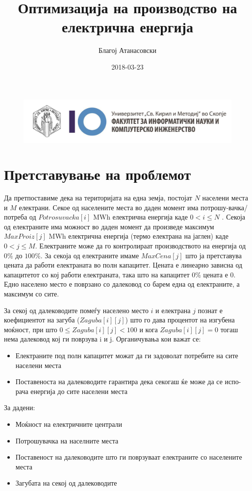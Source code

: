 \documentclass{article}
\title{Оптимизација на производство на електрична енергија}
\date{2018-03-23}
\author{Благој Атанасовски}
\begin{document}
\begin{figure}
\includegraphics[scale=.4]{image}
\end{figure}

\maketitle
\newpage

\section{Претставување на проблемот}
Да претпоставиме дека на територијата на една земја, постојат $N$ населени места и $M$ електрани. Секое од населените места во даден момент има потрошу-вачка/потреба од $ Potrosuvacka[i] $ MWh електрична енергија каде $ 0 < i \leq N $ . Секоја од електраните има можност во даден момент да произведе максимум $MaxProiz[j]$ MWh електрична енергија (термо електрана на јаглен) каде $0 < j \leq M$. Електраните може да го контролираат производството на енергија од $0\%$ до $100\%$. За секоја од електраните имаме $MaxCena[j]$ што ја претставува цената да работи електраната во полн капацитет. Цената е линеарно зависна од капацитетот со кој работи електраната, така што на капацитет 0\% цената е 0. Едно населено место е поврзано со далековод со барем една од електраните, а максимум со сите. 

За секој од далеководите помеѓу населено место $i$ и електрана $j$ познат е коефициентот на загуба ($Zaguba[i][j]$) што го дава процентот на изгубена моќност, при што $0 \leq Zaguba[i][j] < 100 $ и кога $Zaguba[i][j] = 0$ тогаш нема далековод кој ги поврзува i и j. Органичувања кои важат се:
\begin{itemize}
\item Електраните под полн капацитет можат да ги задоволат потребите на сите населени места
\item Поставеноста на далеководите гарантира дека секогаш ќе може да се испо-рача енергија до сите населени места
\end{itemize}

За дадени:
\begin{itemize}
\item Моќност на електричните централи
\item Потрошувачка на населните места
\item Поставеност на далеководите што ги поврзуваат електраните со населените места
\item Загубата на секој од далеководите
\end{itemize}
\end{document}
